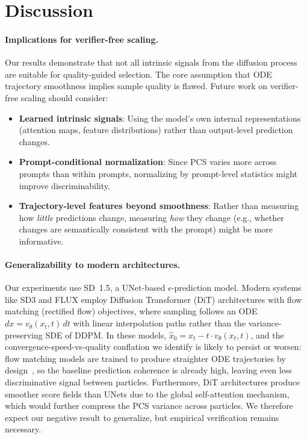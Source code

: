 \documentclass{article}
\newcommand{\pcs}{\textsc{PCS}}
\newcommand{\xhat}{\hat{x}_0}
\begin{document}
\section{Discussion}
\label{sec:discussion}

\paragraph{Implications for verifier-free scaling.} Our results demonstrate that not all intrinsic signals from the diffusion process are suitable for quality-guided selection. The core assumption that ODE trajectory smoothness implies sample quality is flawed. Future work on verifier-free scaling should consider:
\begin{itemize}
    \item \textbf{Learned intrinsic signals}: Using the model's own internal representations (attention maps, feature distributions) rather than output-level prediction changes.
    \item \textbf{Prompt-conditional normalization}: Since \pcs{} varies more across prompts than within prompts, normalizing by prompt-level statistics might improve discriminability.
    \item \textbf{Trajectory-level features beyond smoothness}: Rather than measuring how \emph{little} predictions change, measuring \emph{how} they change (e.g., whether changes are semantically consistent with the prompt) might be more informative.
\end{itemize}

\paragraph{Generalizability to modern architectures.} Our experiments use SD~1.5, a UNet-based $\epsilon$-prediction model. Modern systems like SD3 and FLUX employ Diffusion Transformer (DiT) architectures with flow matching (rectified flow) objectives, where sampling follows an ODE $dx = v_\theta(x_t, t)\,dt$ with linear interpolation paths rather than the variance-preserving SDE of DDPM. In these models, $\xhat = x_t - t \cdot v_\theta(x_t, t)$, and the convergence-speed-vs-quality conflation we identify is likely to persist or worsen: flow matching models are trained to produce straighter ODE trajectories by design~\citep{lipman2023flow}, so the baseline prediction coherence is already high, leaving even less discriminative signal between particles. Furthermore, DiT architectures produce smoother score fields than UNets due to the global self-attention mechanism, which would further compress the \pcs{} variance across particles. We therefore expect our negative result to generalize, but empirical verification remains necessary.
\end{document}
